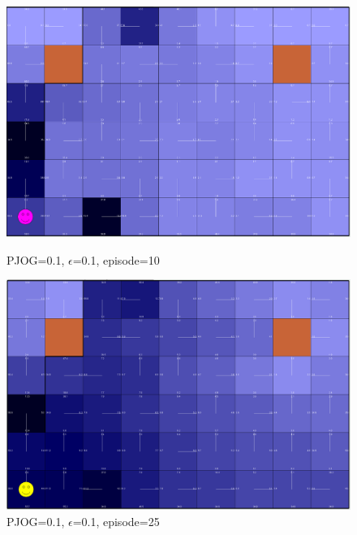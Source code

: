 \documentclass[11pt]{article}
\begin{document}
\begin{figure}[!htb]
   \begin{minipage}{0.4\textwidth}
     \centering
     \includegraphics[width=1.2\linewidth]{../figures/q1_1_10.png}
     \caption{PJOG=0.1, $\epsilon$=0.1, episode=10}\label{Fig:q1_1_10}
   \end{minipage}\hfill
   \begin{minipage}{0.4\textwidth}
     \centering
     \includegraphics[width=1.2\linewidth]{../figures/q1_1_25.png}
     \caption{PJOG=0.1, $\epsilon$=0.1, episode=25}\label{Fig:q1_1_25}
   \end{minipage}
\end{figure}
\end{document}
